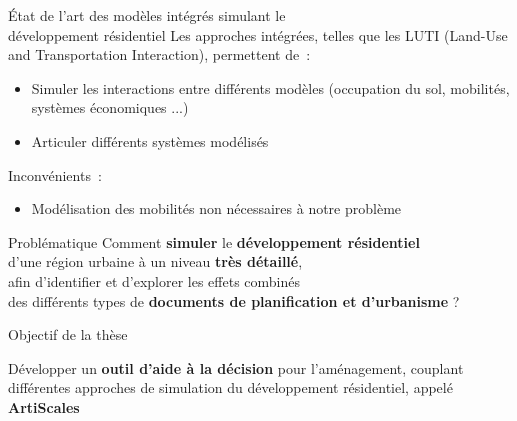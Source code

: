 \documentclass[xcolor=table]{beamer}
\begin{document}
\begin{frame}{État de l'art des modèles intégrés simulant le \\développement résidentiel}
Les approches intégrées, telles que les LUTI (Land-Use and Transportation Interaction), permettent de~:
\begin{itemize}
	\item Simuler les interactions entre différents modèles (occupation du sol, mobilités, systèmes économiques ...) 
	\item Articuler différents systèmes modélisés 
\end{itemize}
Inconvénients~:
\begin{itemize}
	\item Modélisation des mobilités non nécessaires à notre problème
\end{itemize}
\end{frame}

\begin{frame}{Problématique}
	Comment \textbf{simuler} le \textbf{développement résidentiel} \\
	d'une région urbaine à un niveau \textbf{très détaillé}, \\
	afin d'identifier et d'explorer les effets combinés \\
	des différents types de \textbf{documents de planification et d'urbanisme} ?
\end{frame}

\begin{frame}{Objectif de la thèse}
	\begin{block}{}
		Développer un \textbf{outil d'aide à la décision} pour l'aménagement, couplant différentes approches de simulation du développement résidentiel, appelé \textbf{ArtiScales}
	\end{block}
\end{frame}
\end{document}
